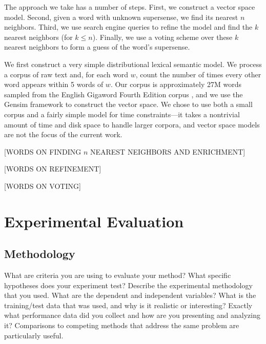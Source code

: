 \documentclass{article}
\begin{document}

The approach we take has a number of steps.
First, we construct a vector space model.
Second, given a word with unknown supersense, we find its nearest $n$ neighbors.
Third, we use search engine queries to refine the model and find the $k$ nearest neighbors (for $k\leq n$).
Finally, we use a voting scheme over these $k$ nearest neighbors to form a guess of the word's supersense.

We first construct a very simple distributional lexical semantic model.
We process a corpus of raw text and, for each word $w$, count the number of times every other word appears within 5 words of $w$.
Our corpus is approximately 27M words sampled from the English Gigaword Fourth Edition corpus \cite{gigaword}, and we use the Gensim framework \cite{gensim} to construct the vector space.
We chose to use both a small corpus and a fairly simple model for time constraints---it takes a nontrivial amount of time and disk space to handle larger corpora, and vector space models are not the focus of the current work.

[WORDS ON FINDING $n$ NEAREST NEIGHBORS AND ENRICHMENT]

[WORDS ON REFINEMENT]

[WORDS ON VOTING]

\section{Experimental Evaluation}

\subsection{Methodology}

What are criteria you are using to evaluate your method? What specific hypotheses does your experiment test? Describe the experimental methodology that you used. What are the dependent and independent variables? What is the training/test data that was used, and why is it realistic or interesting? Exactly what performance data did you collect and how are you presenting and analyzing it? Comparisons to competing methods that address the same problem are particularly useful. 
\end{document}
